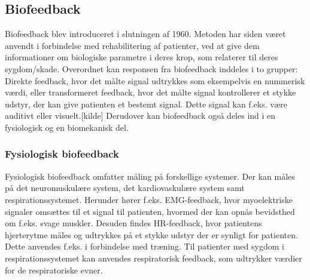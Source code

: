 \subsection{Biofeedback}
Biofeedback blev introduceret i slutningen af 1960. Metoden har siden været anvendt i forbindelse med rehabilitering af patienter, ved at give dem informationer om biologiske parametre i deres krop, som relaterer til deres sygdom/skade. 
Overordnet kan responsen fra biofeedback inddeles i to grupper: Direkte feedback, hvor det målte signal udtrykkes som eksempelvis en nummerisk værdi, eller transformeret feedback, hvor det målte signal kontrollerer et stykke udstyr, der kan give patienten et bestemt signal. Dette signal kan f.eks. være auditivt eller visuelt.[kilde] 
Derudover kan biofeedback også deles ind i en fysiologisk og en biomekanisk del.

\subsubsection{Fysiologisk biofeedback}
Fysiologisk biofeedback omfatter måling på forskellige systemer. Der kan måles på det neuromuskulære system, det kardiovaskulære system samt respirationssystemet. 
Herunder hører f.eks. EMG-feedback, hvor myoelektriske signaler omsættes til et signal til patienten, hvormed der kan opnås bevidsthed om f.eks. svage muskler. Desuden findes HR-feedback, hvor patientens hjerterytme måles og udtrykkes på et stykke udstyr der er synligt for patienten. Dette anvendes f.eks. i forbindelse med træning. Til patienter med sygdom i respirationssystemet kan anvendes respiratorisk feedback, som udtrykker værdier for de respiratoriske evner.

